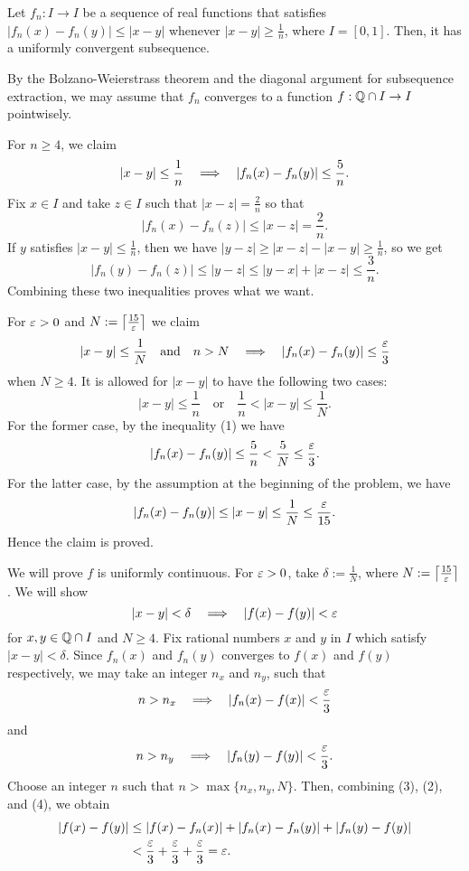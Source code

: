 \documentclass[12pt]{article}
\begin{document}
\clearpage
\begin{prb}
Let $f_n:I\to I$ be a sequence of real functions that satisfies $|f_n(x)-f_n(y)|\le|x-y|$ whenever $|x-y|\ge\frac1n$, where $I=[0,1]$.
Then, it has a uniformly convergent subsequence.
\end{prb}
\begin{sol}
By the Bolzano-Weierstrass theorem and the diagonal argument for subsequence extraction, we may assume that $f_n$ converges to a function $f:\mathbb{Q}\cap I\to I$ pointwisely.

\Step[1]
For $n\ge4$, we claim
\begin{align}|x-y|\le\frac1n\impl|f_n(x)-f_n(y)|\le\frac5n.\end{align}
Fix $x\in I$ and take $z\in I$ such that $|x-z|=\frac2n$ so that
\[|f_n(x)-f_n(z)|\le|x-z|=\frac2n.\]
If $y$ satisfies $|x-y|\le\frac1n$, then we have $|y-z|\ge|x-z|-|x-y|\ge\frac1n$, so we get
\[|f_n(y)-f_n(z)|\le|y-z|\le|y-x|+|x-z|\le\frac3n.\]
Combining these two inequalities proves what we want.

\Step[2]
For $\varepsilon>0$ and $N:=\left\lceil\frac{15}{\varepsilon}\right\rceil$ we claim
\begin{align}|x-y|\le\frac1N\quad\text{and}\quad n>N\impl|f_n(x)-f_n(y)|\le\frac\e3\end{align}
when $N\ge4$.
It is allowed for $|x-y|$ to have the following two cases:
\[|x-y|\le\frac1n\quad\text{or}\quad\frac1n<|x-y|\le\frac1N.\]
For the former case, by the inequality (1) we have
\[|f_n(x)-f_n(y)|\le\frac5n<\frac5N\le\frac{\varepsilon}3.\]
For the latter case, by the assumption at the beginning of the problem, we have
\[|f_n(x)-f_n(y)|\le|x-y|\le\frac1N\le\frac{\varepsilon}{15}.\]
Hence the claim is proved.

\Step[3]
We will prove $f$ is uniformly continuous.
For $\varepsilon>0$, take $\delta:=\frac1N$, where $N:=\left\lceil\frac{15}{\varepsilon}\right\rceil$.
We will show
\[|x-y|<\delta\impl|f(x)-f(y)|<\e\]
for $x,y\in\mathbb{Q}\cap I$ and $N\ge4$.
Fix rational numbers $x$ and $y$ in $I$ which satisfy $|x-y|<\delta$.
Since $f_n(x)$ and $f_n(y)$ converges to $f(x)$ and $f(y)$ respectively, we may take an integer $n_x$ and $n_y$, such that
\begin{align}n>n_x\impl |f_n(x)-f(x)|<\frac\e3\end{align}
and
\begin{align}n>n_y\impl |f_n(y)-f(y)|<\frac\e3.\end{align}
Choose an integer $n$ such that $n>\max\{n_x,n_y,N\}$.
Then, combining (3), (2), and (4), we obtain
\begin{align*}
|f(x)-f(y)|&\le|f(x)-f_n(x)|+|f_n(x)-f_n(y)|+|f_n(y)-f(y)|\\
&<\frac{\varepsilon}3+\frac{\varepsilon}3+\frac{\varepsilon}3=\varepsilon.
\end{align*}


\end{sol}
\end{document}
